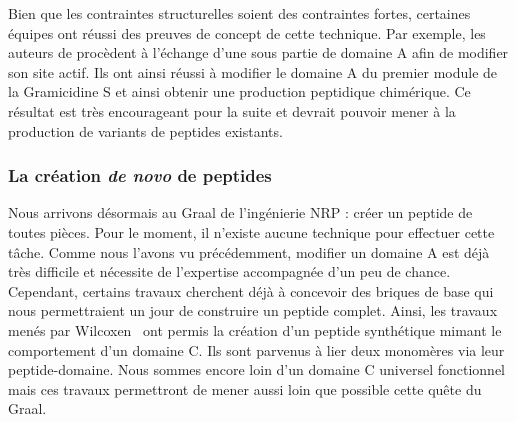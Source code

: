 Bien que les contraintes structurelles soient des contraintes fortes, certaines équipes ont réussi des preuves de concept de cette technique.
Par exemple, les auteurs de \cite{kries_subdomain_2015} procèdent à l'échange d'une sous partie de domaine A afin de modifier son site actif.
Ils ont ainsi réussi à modifier le domaine A du premier module de la Gramicidine S et ainsi obtenir une production peptidique chimérique.
Ce résultat est très encourageant pour la suite et devrait pouvoir mener à la production de variants de peptides existants.


\subsubsection{La création \textit{de novo} de peptides}

Nous arrivons désormais au Graal de l’ingénierie NRP : créer un peptide de toutes pièces.
Pour le moment, il n'existe aucune technique pour effectuer cette tâche.
Comme nous l'avons vu précédemment, modifier un domaine A est déjà très difficile et nécessite de l'expertise accompagnée d'un peu de chance.
Cependant, certains travaux cherchent déjà à concevoir des briques de base qui nous permettraient un jour de construire un peptide complet.
Ainsi, les travaux menés par Wilcoxen~\cite{wilcoxen_biomimetic_2007} ont permis la création d'un peptide synthétique mimant le comportement d'un domaine C.
Ils sont parvenus à lier deux monomères via leur peptide-domaine.
Nous sommes encore loin d'un domaine C universel fonctionnel mais ces travaux permettront de mener aussi loin que possible cette quête du Graal.


